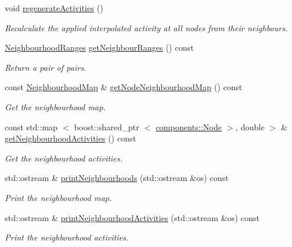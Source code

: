 \begin{DoxyCompactItemize}
void \hyperlink{classcryomesh_1_1structures_1_1NodeMesh_a010992dff04f952fc2de43b12c2b0003}{regenerate\-Activities} ()
\begin{DoxyCompactList}\small\item\em \-Recalculate the applied interpolated activity at all nodes from their neighbours. \end{DoxyCompactList}\item 
\hyperlink{structcryomesh_1_1structures_1_1NodeMesh_1_1NeighbourhoodRanges}{\-Neighbourhood\-Ranges} \hyperlink{classcryomesh_1_1structures_1_1NodeMesh_a7ece5dde420fa8e11d5f341ae35b5ecf}{get\-Neighbour\-Ranges} () const 
\begin{DoxyCompactList}\small\item\em \-Return a pair of pairs. \end{DoxyCompactList}\item 
const \hyperlink{namespacecryomesh_1_1structures_a50c955c70377b1dc7d3fcf1364d5e33e}{\-Neighbourhood\-Map} \& \hyperlink{classcryomesh_1_1structures_1_1NodeMesh_a18d54e3addac89800930d1f8eb2d3790}{get\-Node\-Neighbourhood\-Map} () const 
\begin{DoxyCompactList}\small\item\em \-Get the neighbourhood map. \end{DoxyCompactList}\item 
const std\-::map\*
$<$ boost\-::shared\-\_\-ptr\*
$<$ \hyperlink{classcryomesh_1_1components_1_1Node}{components\-::\-Node} $>$, double $>$ \& \hyperlink{classcryomesh_1_1structures_1_1NodeMesh_a6ba0bd71797a166ebc85375a5a366104}{get\-Neighbourhood\-Activities} () const 
\begin{DoxyCompactList}\small\item\em \-Get the neighbourhood activities. \end{DoxyCompactList}\item 
std\-::ostream \& \hyperlink{classcryomesh_1_1structures_1_1NodeMesh_a712c2b1f420fc8f29926db9e609a0ee8}{print\-Neighbourhoods} (std\-::ostream \&os) const 
\begin{DoxyCompactList}\small\item\em \-Print the neighbourhood map. \end{DoxyCompactList}\item 
std\-::ostream \& \hyperlink{classcryomesh_1_1structures_1_1NodeMesh_a6a850e634ec14509ba12dd52fac8ff20}{print\-Neighbourhood\-Activities} (std\-::ostream \&os) const 
\begin{DoxyCompactList}\small\item\em \-Print the neighbourhood activities. \end{DoxyCompactList}\end{DoxyCompactItemize}
